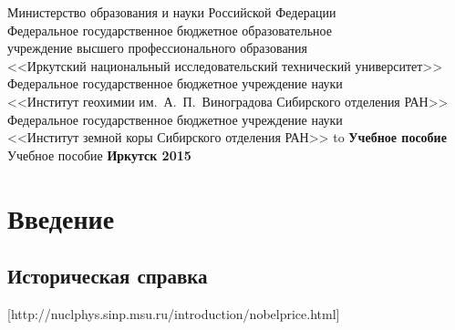\documentclass[a4paper,14pt, openany, twoside, draft]{extbook} %
\newcommand{\aaa}[2][acolor]{\noindent\textcolor{eclr}%
{+\ [}\textcolor{#1}{#2}\textcolor{eclr}{]}}
\begin{document}

\renewcommand{\refname}{Список использованных источников} %
\renewcommand{\bibname}{\refname}
\begin{titlepage}
\thispagestyle{empty}
\begin{center}{\small{}
Министерство образования и науки
Российской Федерации\\
Федеральное государственное бюджетное образовательное\\
учреждение высшего профессионального образования\\
<<Иркутский национальный исследовательский технический университет>> \\[1ex]
Федеральное государственное бюджетное учреждение науки \\
<<Институт геохимии им.~А.~П.~Виноградова
Сибирского отделения РАН>> \\[1ex]
Федеральное государственное бюджетное учреждение науки \\
<<Институт земной коры Сибирского отделения РАН>>
}
\vfill
\hbox to \linewidth{\hfill\bfseries А.~Л.~Финкельштейн, Т.~Ю.~Черкашина\hfill}
 \vspace{2em}
{\large\bfseries Учебное пособие}\\
\vspace{1em}
{Учебное пособие}
\vfill
\vfill
 \textbf{Иркутск 2015}
\end{center}
\end{titlepage}

\clearpage
\tableofcontents
\clearpage

\chapter{Введение}
\label{cha:intro}

\section{Историческая справка}
\label{sec:history}

[http://nuclphys.sinp.msu.ru/introduction/nobelprice.html] \\
\end{document}
